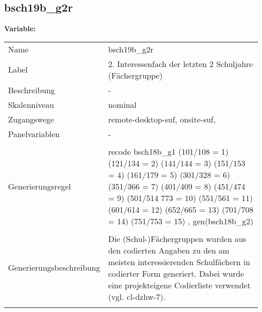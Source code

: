 	
	
	\subsection{bsch19b\_g2r}
	\label{subSection:bsch19b_g2r}

	\noindent\textbf{Variable:}\\
		\begin{tabular}{lL{11.3cm}}
			\label{tableVariable:bsch19b_g2r}
			Name & bsch19b\_g2r \\
			Label & 2. Interessenfach der letzten 2 Schuljahre (Fächergruppe) \\
			Beschreibung & - \\
			Skalenniveau & nominal \\
			Zugangswege &
				remote-desktop-suf,
				onsite-suf,
 \\
			Panelvariablen & -
			 \\
			 \\
					Generierungsregel & recode bsch18b\_g1 (101/108 = 1) (121/134 = 2) (141/144 = 3) 
(151/153 = 4) (161/179 = 5) (301/328 = 6) (351/366 = 7) 
(401/409 = 8) (451/474 = 9) (501/514 773 = 10) (551/561 = 11) 
(601/614 = 12) (652/665 = 13) (701/708 = 14) (751/753 = 15)
, gen(bsch18b\_g2) \\
				 \\
					Generierungsbeschreibung & Die (Schul-)Fächergruppen wurden aus den codierten Angaben zu den am meisten interessierenden Schulfächern in codierter Form generiert. Dabei wurde eine projekteigene Codierliste verwendet (vgl. cl-dzhw-7).
				 \\	
			 \\
		\end{tabular}






